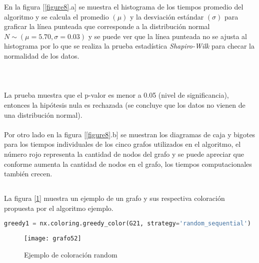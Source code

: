 \documentclass[a4paper, 11pt]{article}
\begin{document}
En la figura [\ref{figure8}.a] se muestra el histograma de los tiempos promedio del algoritmo y se calcula el promedio $(\mu)$ y la desviación estándar $(\sigma)$ para graficar la línea punteada que corresponde a la distribución normal $N\sim(\mu=5.70, \sigma=0.03)$ y se puede ver que la línea punteada no se ajusta al histograma por lo que se realiza la prueba estadística \textit{Shapiro-Wilk} para checar la normalidad de los datos.
\\
\\
\noindent{}
\\
\\
La prueba muestra que el p-valor es menor a 0.05 (nivel de significancia), entonces la hipótesis nula es rechazada (se concluye que los datos no vienen de una distribución normal).
\\
\\
Por otro lado en la figura [\ref{figure8}.b] se muestran los diagramas de caja y bigotes para los tiempos individuales de los cinco grafos utilizados en el algoritmo, el número rojo representa la cantidad de nodos del grafo y se puede apreciar que conforme aumenta la cantidad de nodos en el grafo, los tiempos computacionales también crecen.






\subsection*{}

La figura [\ref{figure9}] muestra un ejemplo de un grafo y sus respectiva coloración propuesta por el algoritmo ejemplo.

\begin{lstlisting}[language=Python]
greedy1 = nx.coloring.greedy_color(G21, strategy='random_sequential')
\end{lstlisting}

\begin{figure}[H]
\texttt{[image: grafo52]}
\caption{Ejemplo de coloración random} \label{figure9}
\end{figure}
\end{document}
